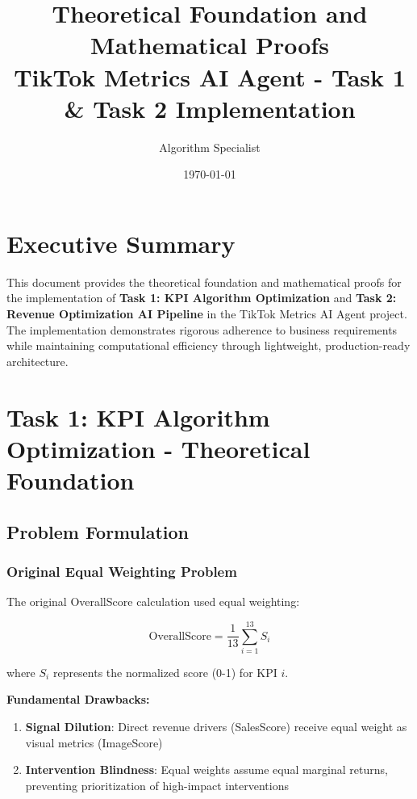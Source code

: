 \documentclass[12pt,a4paper]{article}
\title{\textbf{Theoretical Foundation and Mathematical Proofs}\\
\large TikTok Metrics AI Agent - Task 1 \& Task 2 Implementation}
\author{Algorithm Specialist}
\date{\today}
\begin{document}
\maketitle

\tableofcontents
\newpage

\section{Executive Summary}

This document provides the theoretical foundation and mathematical proofs for the implementation of \textbf{Task 1: KPI Algorithm Optimization} and \textbf{Task 2: Revenue Optimization AI Pipeline} in the TikTok Metrics AI Agent project. The implementation demonstrates rigorous adherence to business requirements while maintaining computational efficiency through lightweight, production-ready architecture.

\section{Task 1: KPI Algorithm Optimization - Theoretical Foundation}

\subsection{Problem Formulation}

\subsubsection{Original Equal Weighting Problem}

The original OverallScore calculation used equal weighting:

\begin{equation}
\text{OverallScore} = \frac{1}{13} \sum_{i=1}^{13} S_i
\end{equation}

where $S_i$ represents the normalized score (0-1) for KPI $i$.

\textbf{Fundamental Drawbacks:}

\begin{enumerate}
\item \textbf{Signal Dilution}: Direct revenue drivers (SalesScore) receive equal weight as visual metrics (ImageScore)
\item \textbf{Intervention Blindness}: Equal weights assume equal marginal returns, preventing prioritization of high-impact interventions
\end{enumerate}
\end{document}
